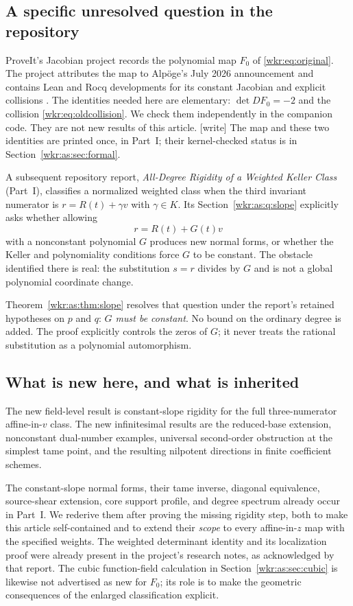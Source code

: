 \documentclass[11pt,a4paper]{article}
\numberwithin{equation}{section}
\theoremstyle{definition}
\theoremstyle{remark}
\begin{document}
\subsection{A specific unresolved question in the repository}

ProveIt's Jacobian project records the polynomial map $F_0$ of
\eqref{wkr:eq:original}. The project attributes the map to Alp\"oge's July
2026 announcement and contains Lean and Rocq developments for its constant
Jacobian and explicit collisions \cite{repo-9b24}. The identities needed
here are elementary: $\det DF_0=-2$ and the collision
\eqref{wkr:eq:oldcollision}. We check them independently in the companion
code. They are not new results of this article.
\textup{[write]} The map and these two identities are printed once, in
Part~I; their kernel-checked status is in
Section~\ref{wkr:as:sec:formal}.

A subsequent repository report, \emph{All-Degree Rigidity of a Weighted
Keller Class} (Part~I), classifies a normalized weighted class when the
third invariant numerator is $r=R(t)+\gamma v$ with $\gamma\in K$. Its
Section~\ref{wkr:as:q:slope} explicitly asks whether allowing
\[
r=R(t)+G(t)v
\]
with a nonconstant polynomial $G$ produces new normal forms, or whether
the Keller and polynomiality conditions force $G$ to be constant. The
obstacle identified there is real: the substitution $s=r$ divides by $G$
and is not a global polynomial coordinate change.

Theorem~\ref{wkr:as:thm:slope} resolves that question under the report's
retained hypotheses on $p$ and $q$: \emph{$G$ must be constant}. No bound
on the ordinary degree is added. The proof explicitly controls the zeros
of $G$; it never treats the rational substitution as a polynomial
automorphism.

\subsection{What is new here, and what is inherited}

The new field-level result is constant-slope rigidity for the full
three-numerator affine-in-$v$ class. The new infinitesimal results are the
reduced-base extension, nonconstant dual-number examples, universal
second-order obstruction at the simplest tame point, and the resulting
nilpotent directions in finite coefficient schemes.

The constant-slope normal forms, their tame inverse, diagonal
equivalence, source-shear extension, core support profile, and degree
spectrum already occur in Part~I. We rederive them after proving the
missing rigidity step, both to make this article self-contained and to
extend their \emph{scope} to every affine-in-$z$ map with the specified
weights. The weighted determinant identity and its localization proof were
already present in the project's research notes, as acknowledged by that
report. The cubic function-field calculation in
Section~\ref{wkr:as:sec:cubic} is likewise not advertised as new for
$F_0$; its role is to make the geometric consequences of the enlarged
classification explicit.
\end{document}
